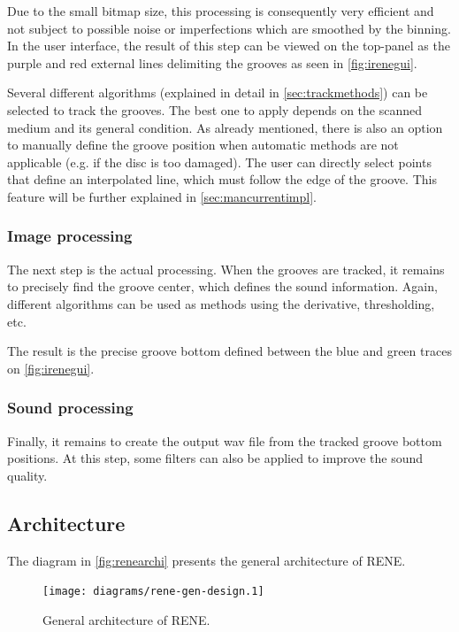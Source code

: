 Due to the small bitmap size, this processing is consequently very efficient and not subject to possible noise or imperfections which are smoothed by the binning. In the user interface, the result of this step can be viewed on the top-panel as the purple and red external lines delimiting the grooves as seen in \autoref{fig:irenegui}.

Several different algorithms (explained in detail in \autoref{sec:trackmethods}) can be selected to track the grooves. The best one to apply depends on the scanned medium and its general condition. As already mentioned, there is also an option to manually define the groove position when automatic methods are not applicable (e.g. if the disc is too damaged). The user can directly select points that define an interpolated line, which must follow the edge of the groove. This feature will be further explained in \autoref{sec:mancurrentimpl}.

\subsubsection{Image processing}

The next step is the actual processing. When the grooves are tracked, it remains to precisely find the groove center, which defines the sound information. Again, different algorithms can be used as methods using the derivative, thresholding, etc.

The result is the precise groove bottom defined between the blue and green traces on \autoref{fig:irenegui}.

\subsubsection{Sound processing}

Finally, it remains to create the output \gls{wav} file from the tracked groove bottom positions. At this step, some filters can also be applied to improve the sound quality.

\subsection{Architecture}

The diagram in \autoref{fig:renearchi} presents the general architecture of RENE.

\begin{figure}[!ht]
\centering
\texttt{[image: diagrams/rene-gen-design.1]}
\caption{General architecture of RENE.}
\label{fig:renearchi}
\end{figure}

